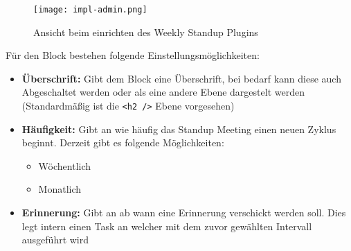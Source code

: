 \begin{figure}[H]
	\centering
	\texttt{[image: impl-admin.png]}
    \caption{Ansicht beim einrichten des Weekly Standup Plugins}
	\label{fig:adminpanel}
\end{figure}

Für den Block bestehen folgende Einstellungsmöglichkeiten:

\begin{itemize}
    \item \textbf{Überschrift:} Gibt dem Block eine Überschrift, bei bedarf kann diese auch Abgeschaltet werden oder als eine andere Ebene dargestelt werden (Standardmäßig ist die \verb|<h2 />| Ebene vorgesehen) 
    \item \textbf{Häufigkeit:} Gibt an wie häufig das Standup Meeting einen neuen Zyklus beginnt. Derzeit gibt es folgende Möglichkeiten:
    \begin{itemize}
        \item Wöchentlich
        \item Monatlich
      \end{itemize}
    \item \textbf{Erinnerung:} Gibt an ab wann eine Erinnerung verschickt werden soll. Dies legt intern einen Task an welcher mit dem zuvor gewählten Intervall ausgeführt wird
\end{itemize}
